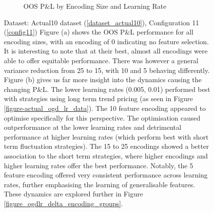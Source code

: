\documentclass[a4paper,11pt,oneside]{article}
\theoremstyle{plain}
\theoremstyle{definition}
\begin{document}
\begin{figure}[H]
\begin{subfigure}{1.0\linewidth}
			\caption[OOS P\&L by Encoding Size and Learning Rate]{OOS P\&L by Encoding Size and Learning Rate}
		\end{subfigure}	
		\caption[OOS P\&L By Feature Selection Size and OGD Learning Rate]
		{Dataset: Actual10 dataset (\ref{dataset_actual10}), Configuration 11 (\ref{config11})		
		\newline Figure (a) shows the OOS P\&L performance for all encoding sizes, with an encoding of 0 indicating no feature selection. It is interesting to note that at their best, almost all encodings were able to offer equitable performance. There was however a general variance reduction from 25 to 15, with 10 and 5 behaving differently. Figure (b) gives us far more insight into the dynamics causing the changing P\&L. The lower learning rates (0.005, 0.01) performed best with strategies using long term trend pricing (as seen in Figure \ref{figure-actual_ogd_lr_data}). The 10 feature encoding appeared to optimise specifically for this perspective. The optimisation caused outperformance at the lower learning rates and detrimental performance at higher learning rates (which perform best with short term fluctuation strategies). The 15 to 25 encodings showed a better association to the short term strategies, where higher encodings and higher learning rates offer the best performance. Notably, the 5 feature encoding offered very consistent performance across learning rates, further emphasising the learning of generalisable features. These dynamics are explored further in Figure \ref{figure_ogdlr_delta_encoding_groups}.}
	\label{figure-encoding_pl_median}
	\end{figure}
		
\end{document}
